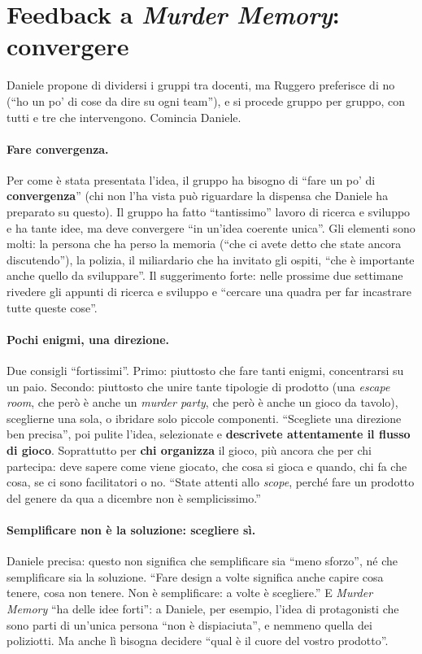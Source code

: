 \section{Feedback a \emph{Murder Memory}: convergere}
\label{a11:sec:fbmurder}

Daniele propone di dividersi i gruppi tra docenti, ma Ruggero preferisce di no (``ho un
po' di cose da dire su ogni team''), e si procede gruppo per gruppo, con tutti e tre che
intervengono. Comincia Daniele.

\paragraph{Fare convergenza.} Per come è stata presentata l'idea, il gruppo ha bisogno di
``fare un po' di \textbf{convergenza}'' (chi non l'ha vista può riguardare la dispensa
che Daniele ha preparato su questo). Il gruppo ha fatto ``tantissimo'' lavoro di ricerca
e sviluppo e ha tante idee, ma deve convergere ``in un'idea coerente unica''. Gli
elementi sono molti: la persona che ha perso la memoria (``che ci avete detto che state
ancora discutendo''), la polizia, il miliardario che ha invitato gli ospiti, ``che è
importante anche quello da sviluppare''. Il suggerimento forte: nelle prossime due
settimane rivedere gli appunti di ricerca e sviluppo e ``cercare una quadra per far
incastrare tutte queste cose''.

\paragraph{Pochi enigmi, una direzione.} Due consigli ``fortissimi''. Primo: piuttosto
che fare tanti enigmi, concentrarsi su un paio. Secondo: piuttosto che unire tante
tipologie di prodotto (una \emph{escape room}, che però è anche un \emph{murder party},
che però è anche un gioco da tavolo), sceglierne una sola, o ibridare solo piccole
componenti. ``Scegliete una direzione ben precisa'', poi pulite l'idea, selezionate e
\textbf{descrivete attentamente il flusso di gioco}. Soprattutto per \textbf{chi
organizza} il gioco, più ancora che per chi partecipa: deve sapere come viene giocato,
che cosa si gioca e quando, chi fa che cosa, se ci sono facilitatori o no. ``State
attenti allo \emph{scope}, perché fare un prodotto del genere da qua a dicembre non è
semplicissimo.''

\paragraph{Semplificare non è la soluzione: scegliere sì.} Daniele precisa: questo non
significa che semplificare sia ``meno sforzo'', né che semplificare sia la soluzione.
``Fare design a volte significa anche capire cosa tenere, cosa non tenere. Non è
semplificare: a volte è scegliere.'' E \emph{Murder Memory} ``ha delle idee forti'': a
Daniele, per esempio, l'idea di protagonisti che sono parti di un'unica persona ``non è
dispiaciuta'', e nemmeno quella dei poliziotti. Ma anche lì bisogna decidere ``qual è il
cuore del vostro prodotto''.

